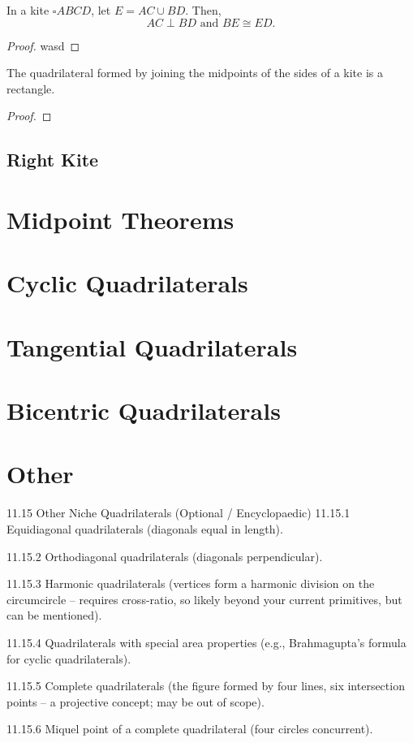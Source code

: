 \documentclass[../../../main/main.tex]{subfiles}
\begin{document}
\begin{theorem}
    In a kite $\square ABCD$, let $E = AC \cup BD$. Then,
    \[
    AC \perp BD \text{ and } BE \cong ED.
    \]
\end{theorem}
\begin{proof}
    wasd
\end{proof}

\begin{theorem}
    The quadrilateral formed by joining the midpoints of the sides of a kite is a rectangle.
\end{theorem}
\begin{proof}

\end{proof}

\subsection{Right Kite}

\section{Midpoint Theorems}

\section{Cyclic Quadrilaterals}

\section{Tangential Quadrilaterals}

\section{Bicentric Quadrilaterals}

\section{Other}
11.15 Other Niche Quadrilaterals (Optional / Encyclopaedic)
11.15.1 Equidiagonal quadrilaterals (diagonals equal in length).

11.15.2 Orthodiagonal quadrilaterals (diagonals perpendicular).

11.15.3 Harmonic quadrilaterals (vertices form a harmonic division on the circumcircle – requires cross-ratio, so likely beyond your current primitives, but can be mentioned).

11.15.4 Quadrilaterals with special area properties (e.g., Brahmagupta’s formula for cyclic quadrilaterals).

11.15.5 Complete quadrilaterals (the figure formed by four lines, six intersection points – a projective concept; may be out of scope).

11.15.6 Miquel point of a complete quadrilateral (four circles concurrent).
\end{document}
